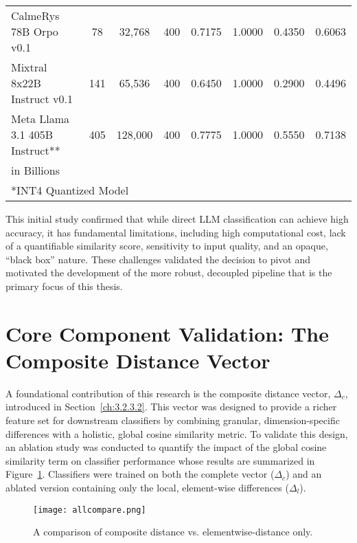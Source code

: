 \begin{table}[tb]
{\begin{tabular}{lccccccc}
            CalmeRys 78B Orpo v0.1          & 78                   & 32,768                          & 400              & 0.7175            & 1.0000 & 0.4350          & 0.6063          \\
            Mixtral 8x22B Instruct v0.1     & 141                  & 65,536                          & 400              & 0.6450            & 1.0000 & 0.2900          & 0.4496          \\
            Meta Llama 3.1 405B Instruct**  & 405                  & 128,000                         & 400              & 0.7775            & 1.0000 & 0.5550          & 0.7138          \\
            \bottomrule
            \multicolumn{8}{l}{\footnotesize *in Billions}                                                                                                                               \\
            \multicolumn{8}{l}{\footnotesize **INT4 Quantized Model}
        \end{tabular}
    }
\end{table}

This initial study confirmed that while direct LLM classification can achieve high accuracy, it has fundamental limitations, including high computational cost, lack of a quantifiable similarity score, sensitivity to input quality, and an opaque, ``black box'' nature. These challenges validated the decision to pivot and motivated the development of the more robust, decoupled pipeline that is the primary focus of this thesis.

\section{Core Component Validation: The Composite Distance Vector}\label{ch:4.3}
A foundational contribution of this research is the composite distance vector, \(\Delta_c\), introduced in Section~\ref{ch:3.2.3.2}. This vector was designed to provide a richer feature set for downstream classifiers by combining granular, dimension-specific differences with a holistic, global cosine similarity metric. To validate this design, an ablation study was conducted to quantify the impact of the global cosine similarity term on classifier performance whose results are summarized in Figure~\ref{fig:ablation}. Classifiers were trained on both the complete vector (\(\Delta_c\)) and an ablated version containing only the local, element-wise differences (\(\Delta_l\)).

\begin{figure}[tb]
    \captionsetup{skip=5pt}
    \centering
    \texttt{[image: allcompare.png]}
    \caption{A comparison of composite distance vs. elementwise-distance only.}
    \label{fig:ablation}
\end{figure}


